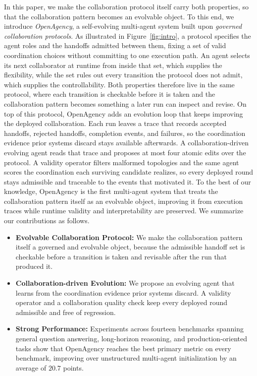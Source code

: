 \documentclass{article} %
\begin{document}
In this paper, we make the collaboration protocol itself carry both properties, so that the collaboration pattern becomes an evolvable object. To this end, we introduce \emph{OpenAgency}, a self-evolving multi-agent system built upon \emph{governed collaboration protocols}. As illustrated in Figure~\ref{fig:intro}, a protocol specifies the agent roles and the handoffs admitted between them, fixing a set of valid coordination choices without committing to one execution path. An agent selects its next collaborator at runtime from inside that set, which supplies the flexibility, while the set rules out every transition the protocol does not admit, which supplies the controllability. Both properties therefore live in the same protocol, where each transition is checkable before it is taken and the collaboration pattern becomes something a later run can inspect and revise.
On top of this protocol, OpenAgency adds an evolution loop that keeps improving the deployed collaboration. Each run leaves a trace that records accepted handoffs, rejected handoffs, completion events, and failures, so the coordination evidence prior systems discard stays available afterwards. A collaboration-driven evolving agent reads that trace and proposes at most four atomic edits over the protocol. A validity operator filters malformed topologies and the same agent scores the coordination each surviving candidate realizes, so every deployed round stays admissible and traceable to the events that motivated it. To the best of our knowledge, OpenAgency is the first multi-agent system that treats the collaboration pattern itself as an evolvable object, improving it from execution traces while runtime validity and interpretability are preserved. We summarize our contributions as follows.
\begin{itemize}[leftmargin=1em, itemsep=0ex, topsep=0ex]
    \item \textbf{Evolvable Collaboration Protocol:} We make the collaboration pattern itself a governed and evolvable object, because the admissible handoff set is checkable before a transition is taken and revisable after the run that produced it.
    \item \textbf{Collaboration-driven Evolution:} We propose an evolving agent that learns from the coordination evidence prior systems discard. A validity operator and a collaboration quality check keep every deployed round admissible and free of regression.
    \item \textbf{Strong Performance:} Experiments across fourteen benchmarks spanning general question answering, long-horizon reasoning, and production-oriented tasks show that OpenAgency reaches the best primary metric on every benchmark, improving over unstructured multi-agent initialization by an average of $20.7$ points.
\end{itemize}
\end{document}

